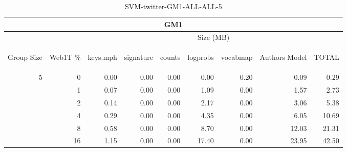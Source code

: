 \begin{center}
\begin{table}[htbp] 
 \begin{center}
\begin{tabular}{ | r | r | r | r | r | r | r | r | r |}
\hline
\multicolumn{9}{|c|}{GM1}\\
\hline
 & & \multicolumn{7}{|c|}{Size (MB)}\\ \cline{3-9}
\begin{sideways}Group Size\end{sideways} & \begin{sideways}Web1T \% \end{sideways} & \begin{sideways}keys.mph\end{sideways} & \begin{sideways}signature\end{sideways} & \begin{sideways}counts\end{sideways} & \begin{sideways}logprobs\end{sideways} & \begin{sideways}vocabmap\end{sideways} & \begin{sideways}Authors Model \end{sideways} & \begin{sideways}TOTAL\end{sideways}\\
\hline
\multirow{5}{*}{5}
 & 0 & 0.00 & 0.00 & 0.00 & 0.00 & 0.20 & 0.09 & 0.29\\ \cline{2-9}
 & 1 & 0.07 & 0.00 & 0.00 & 1.09 & 0.00 & 1.57 & 2.73\\ \cline{2-9}
 & 2 & 0.14 & 0.00 & 0.00 & 2.17 & 0.00 & 3.06 & 5.38\\ \cline{2-9}
 & 4 & 0.29 & 0.00 & 0.00 & 4.35 & 0.00 & 6.05 & 10.69\\ \cline{2-9}
 & 8 & 0.58 & 0.00 & 0.00 & 8.70 & 0.00 & 12.03 & 21.31\\ \cline{2-9}
 & 16 & 1.15 & 0.00 & 0.00 & 17.40 & 0.00 & 23.95 & 42.50\\ \cline{2-9}
\hline
\end{tabular}
\caption{SVM-twitter-GM1-ALL-ALL-5}
\label{table:SVM-twitter-GM1-ALL-ALL-5}
\end{center}
 \end{table}
\end{center}


